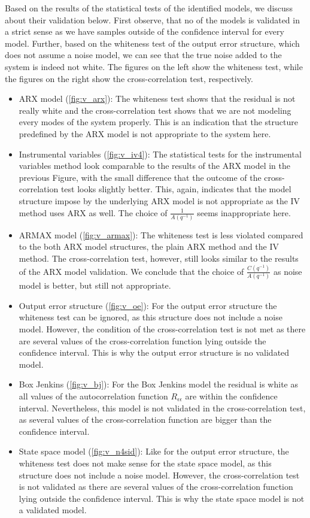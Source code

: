 \noindent Based on the results of the statistical tests of the identified models, we discuss about their validation below.
First observe, that no of the models is validated in a strict sense as we have samples outside of the confidence interval for every model.
Further, based on the whiteness test of the output error structure, which does not assume a noise model, we can see that the true noise added to the system is indeed not white.
The figures on the left show the whiteness test, while the figures on the right show the cross-correlation test, respectively.
\begin{itemize}
\item{ARX model (\ref{fig:v_arx}): } The whiteness test shows that the residual is not really white and the cross-correlation test shows that we are not modeling every modes of the system properly. This is an indication that the structure predefined by the ARX model is not appropriate to the system here.
\item{Instrumental variables (\ref{fig:v_iv4}): } The statistical tests for the instrumental variables method look comparable to the results of the ARX model in the previous Figure, with the small difference that the outcome of the cross-correlation test looks slightly better. This, again, indicates that the model structure impose by the underlying ARX model is not appropriate as the IV method uses ARX as well. The choice of $\frac{1}{A(q^{-1})}$ seems inappropriate here.
\item{ARMAX model (\ref{fig:v_armax}): } The whiteness test is less violated compared to the both ARX model structures, the plain ARX method and the IV method. The cross-correlation test, however, still looks similar to the results of the ARX model validation. We conclude that the choice of $\frac{C(q^{-1})}{A(q^{-1})}$ as noise model is better, but still not appropriate.
\item{Output error structure (\ref{fig:v_oe}): } For the output error structure the whiteness test can be ignored, as this structure does not include a noise model. However, the condition of the cross-correlation test is not met as there are several values of the cross-correlation function lying outside the confidence interval. This is why the output error structure is no validated model. 
\item{Box Jenkins (\ref{fig:v_bj}): } For the Box Jenkins model the residual is white as all values of the autocorrelation function $R_{\epsilon \epsilon}$ are within the confidence interval. Nevertheless, this model is not validated in the cross-correlation test, as several values of the cross-correlation function are bigger than the confidence interval.
\item{State space model (\ref{fig:v_n4sid}): } Like for the output error structure, the whiteness test does not make sense for the state space model, as this structure does not include a noise model. However, the cross-correlation test is not validated as there are several values of the cross-correlation function lying outside the confidence interval. This is why the state space model is not a validated model.
\end{itemize}

